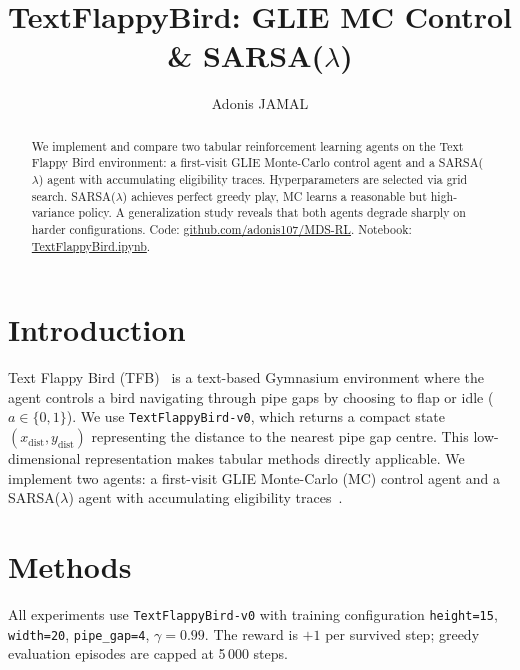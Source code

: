 \documentclass[runningheads]{llncs}
\begin{document}
\title{TextFlappyBird: GLIE MC Control \& SARSA($\lambda$)}
\author{Adonis JAMAL}

\maketitle

\begin{abstract}
    We implement and compare two tabular reinforcement learning agents on the Text Flappy Bird environment: a first-visit GLIE Monte-Carlo control agent and a SARSA($\lambda$) agent with accumulating eligibility traces. Hyperparameters are selected via grid search. SARSA($\lambda$) achieves perfect greedy play, MC learns a reasonable but high-variance policy. A generalization study reveals that both agents degrade sharply on harder configurations. Code: \href{https://github.com/adonis107/MDS-RL/tree/main/individual\%20assignment}{github.com/adonis107/MDS-RL}. Notebook: \href{https://github.com/adonis107/MDS-RL/blob/main/individual%20assignment/notebooks/RL_TextFlappyBird_JAMAL.ipynb}{TextFlappyBird.ipynb}.
\end{abstract}

\section{Introduction}
Text Flappy Bird (TFB)~\cite{tfb} is a text-based Gymnasium environment where the agent controls a bird navigating through pipe gaps by choosing to flap or idle ($a \in \{0, 1\}$). We use \texttt{TextFlappyBird-v0}, which returns a compact state $(x_\text{dist}, y_\text{dist})$ representing the distance to the nearest pipe gap centre. This low-dimensional representation makes tabular methods directly applicable. We implement two agents: a first-visit GLIE Monte-Carlo (MC) control agent and a SARSA($\lambda$) agent with accumulating eligibility traces~\cite{sutton2018}.

\section{Methods}
All experiments use \texttt{TextFlappyBird-v0} with training configuration \texttt{height=15}, \texttt{width=20}, \texttt{pipe\_gap=4}, $\gamma = 0.99$. The reward is $+1$ per survived step; greedy evaluation episodes are capped at 5\,000 steps.
\end{document}
